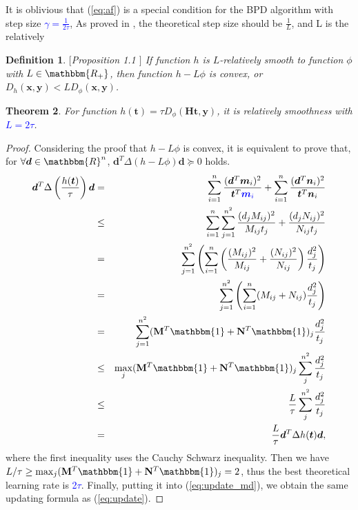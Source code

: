 \documentclass[conference]{IEEEtran}
\newtheorem{thm}{Theorem}
\newtheorem{definition}[thm]{Definition}
\newcommand{\mat}[1]{\mathbf{#1}}
\renewcommand{\vec}[1]{\bm{#1}}
\newcommand{\changeSX}[1]{\textcolor{blue}{#1}}
\begin{document}
It is oblivious that (\ref{eq:af}) is a special condition for the BPD algorithm with step size \changeSX{$\gamma = \frac{1}{2\tau}$},
As proved in \cite{bauschke2017descent}, the theoretical step size should be $\frac{1}{L}$, and L is the relatively
\begin{definition}$[$Proposition 1.1 \cite{doi:10.1137/16M1099546}$]$
If function $h$ is $L$-relatively smooth to function $\phi$ with $L\in {\mathbbm{R_{+}}}$, then function $h-L\phi$ is convex, or $D_h(\vec x,\vec y)<LD_{\phi}(\vec x,\vec y)$.
\end{definition}


\begin{thm}
For function $h(\vec t) = \tau D_{\phi}(\mat H \vec t, \vec y)$, it is relatively smoothness with \changeSX{$L = 2\tau$}.
\end{thm}
\begin{proof}
Considering the proof that $h-L\phi$ is convex, it is equivalent to prove that, for $\forall \vec d\in{\mathbbm{R}^n}$, $\vec d^{T}\Delta (h-L\phi) \vec d\succeq 0$ holds.
\begin{eqnarray*}
\vec d^{T}\Delta \left(\frac{h(\vec t)}{\tau}\right)\vec d &=& \sum_{i=1}^{n}{\frac{(\vec d^{T}\vec {m}_i)^2}{\vec t^{T} \changeSX{\vec m_i}}}+\sum_{i=1}^{n}{\frac{(\vec d^{T}\vec n_i)^2}{\vec t^{T}\vec n_i}}\\
&\leq& \sum_{i=1}^{n}\sum_{j=1}^{n^2}{\frac{(d_j M_{ij})^2}{ M_{ij}t_j}+\frac{(d_j N_{ij})^2}{ N_{ij}t_j}}\\
&=&\sum_{j=1}^{n^2}\left(\sum_{i=1}^{n}\left(\frac{( M_{ij})^2}{ M_{ij}}+\frac{( N_{ij})^2}{ N_{ij}}\right)\frac{d_{j}^{2}}{t_j}\right)\\
&=&\sum_{j=1}^{n^2}\left(\sum_{i=1}^{n}({ M_{ij}}+{ N_{ij}})\frac{d_{j}^{2}}{t_j}\right)\\
&=&\sum_{j=1}^{n^2}({\mat M^{T}\mathbbm{1}}+{\mat N^{T}\mathbbm{1}})_{j}\frac{d_{j}^{2}}{t_j}\\
&\leq& \max_{j} ({\mat M^{T}\mathbbm{1}}+{\mat N^{T}\mathbbm{1}})_{j} \sum_{j}^{n^2}\frac{d_{j}^{2}}{t_j}\\
&\leq& \frac{L}{\tau} \sum_{j}^{n^2}\frac{d_{j}^{2}}{t_j}\\
&=& \frac{L}{\tau} \vec d^{T}\Delta h(\vec t)\vec d,
\end{eqnarray*}
where the first inequality uses the Cauchy Schwarz inequality.
Then we have $L/\tau \geq \max_{j} ({\mat M^{T}\mathbbm{1}}+{\mat N^{T}\mathbbm{1}})_{j} = 2$, thus the best theoretical learning rate is \changeSX{2$\tau$}. Finally, putting it into (\ref{eq:update_md}), we obtain the same updating formula as (\ref{eq:update}).
\end{proof}
\end{document}
